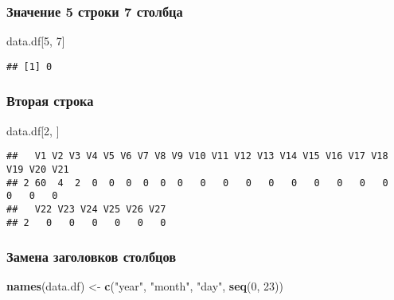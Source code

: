 \documentclass[
]{article}
\newenvironment{Shaded}{\begin{snugshade}}{\end{snugshade}}
\newcommand{\DecValTok}[1]{\textcolor[rgb]{0.00,0.00,0.81}{#1}}
\newcommand{\FunctionTok}[1]{\textcolor[rgb]{0.13,0.29,0.53}{\textbf{#1}}}
\newcommand{\NormalTok}[1]{#1}
\newcommand{\OtherTok}[1]{\textcolor[rgb]{0.56,0.35,0.01}{#1}}
\newcommand{\StringTok}[1]{\textcolor[rgb]{0.31,0.60,0.02}{#1}}
\begin{document}
\subsubsection{Значение 5 строки 7
столбца}\label{ux437ux43dux430ux447ux435ux43dux438ux435-5-ux441ux442ux440ux43eux43aux438-7-ux441ux442ux43eux43bux431ux446ux430}

\begin{Shaded}
\begin{Highlighting}[]
\NormalTok{data.df[}\DecValTok{5}\NormalTok{, }\DecValTok{7}\NormalTok{]}
\end{Highlighting}
\end{Shaded}

\begin{verbatim}
## [1] 0
\end{verbatim}

\subsubsection{Вторая
строка}\label{ux432ux442ux43eux440ux430ux44f-ux441ux442ux440ux43eux43aux430}

\begin{Shaded}
\begin{Highlighting}[]
\NormalTok{data.df[}\DecValTok{2}\NormalTok{, ]}
\end{Highlighting}
\end{Shaded}

\begin{verbatim}
##   V1 V2 V3 V4 V5 V6 V7 V8 V9 V10 V11 V12 V13 V14 V15 V16 V17 V18 V19 V20 V21
## 2 60  4  2  0  0  0  0  0  0   0   0   0   0   0   0   0   0   0   0   0   0
##   V22 V23 V24 V25 V26 V27
## 2   0   0   0   0   0   0
\end{verbatim}

\subsubsection{Замена заголовков
столбцов}\label{ux437ux430ux43cux435ux43dux430-ux437ux430ux433ux43eux43bux43eux432ux43aux43eux432-ux441ux442ux43eux43bux431ux446ux43eux432}

\begin{Shaded}
\begin{Highlighting}[]
\FunctionTok{names}\NormalTok{(data.df) }\OtherTok{\textless{}{-}} \FunctionTok{c}\NormalTok{(}\StringTok{"year"}\NormalTok{, }\StringTok{"month"}\NormalTok{, }\StringTok{"day"}\NormalTok{, }\FunctionTok{seq}\NormalTok{(}\DecValTok{0}\NormalTok{, }\DecValTok{23}\NormalTok{))}
\end{Highlighting}
\end{Shaded}
\end{document}
